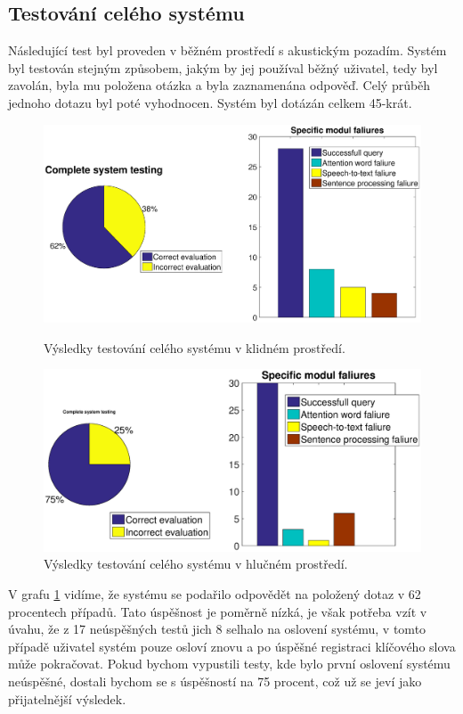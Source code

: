 \documentclass[12pt,a4paper]{article}
\begin{document}
\subsection{Testování celého systému}
Následující test byl proveden v běžném prostředí s akustickým pozadím. Systém byl testován stejným způsobem, jakým by jej používal běžný uživatel, tedy byl zavolán, byla mu položena otázka a byla zaznamenána odpověď. Celý průběh jednoho dotazu byl poté vyhodnocen. Systém byl dotázán celkem 45-krát.

\begin{figure}[ht]
	\begin{center}
		\includegraphics[width = 1\textwidth ]{full.eps}
		\caption{Výsledky testování celého systému v klidném prostředí.}
		\label{fig:full}
	\end{center}

	\begin{center}
		\includegraphics[width = 1\textwidth ]{full2.eps}
		\caption{Výsledky testování celého systému v hlučném prostředí.}
		\label{fig:full}
	\end{center}
\end{figure}

V grafu \ref{fig:full} vidíme, že systému se podařilo odpovědět na položený dotaz v 62 procentech případů. Tato úspěšnost je poměrně nízká, je však potřeba vzít v úvahu, že z 17 neúspěšných testů jich 8 selhalo na oslovení systému, v tomto případě uživatel systém pouze osloví znovu a po úspěšné registraci klíčového slova může pokračovat. Pokud bychom vypustili testy, kde bylo první oslovení systému neúspěšné, dostali bychom se s úspěšností na 75 procent, což už se jeví jako přijatelnější výsledek.
\end{document}
